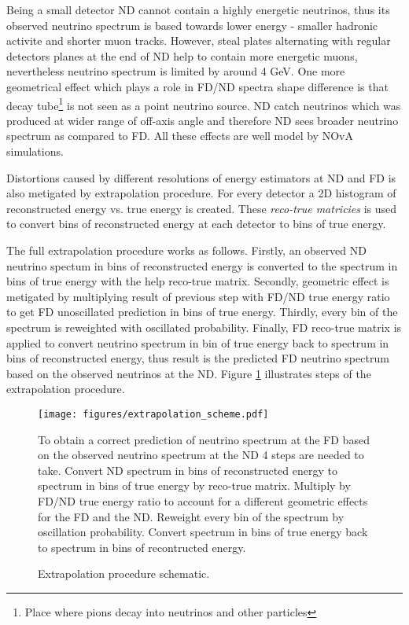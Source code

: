 Being a small detector ND cannot contain a highly energetic neutrinos, thus its observed neutrino
spectrum is based towards lower energy - smaller hadronic activite and shorter muon tracks. However,
steal plates alternating with regular detectors planes at the end of ND help to contain more
energetic muons, nevertheless neutrino spectrum is limited by around 4 GeV. One more geometrical effect
which plays a role in FD/ND spectra shape difference is that decay tube\footnote{Place where pions
decay into neutrinos and other particles} is not seen as a point neutrino source. ND catch neutrinos
which was produced at wider range of off-axis angle and therefore ND sees broader neutrino spectrum 
as compared to FD. All these effects are well model by NOvA simulations.

Distortions caused by different resolutions of energy estimators at ND and FD is also metigated by
extrapolation procedure. For every detector a 2D histogram of reconstructed energy vs. true energy
is created. These \textit{reco-true matricies} is used to convert bins of reconstructed energy at
each detector to bins of true energy. 

The full extrapolation procedure works as follows. Firstly, an observed ND neutrino spectum in bins of 
reconstructed energy is converted to the spectrum in bins of true energy with the help reco-true 
matrix. Secondly, geometric effect is metigated by multiplying result of previous step with FD/ND 
true energy ratio to get FD unoscillated prediction in bins of true energy. Thirdly, every bin of the 
spectrum is reweighted with oscillated probability. Finally, FD reco-true matrix is applied to 
convert neutrino spectrum in bin of true energy back to spectrum in bins of reconstructed energy,
thus result is the predicted FD neutrino spectrum based on the observed neutrinos at the ND. 
Figure \ref{fig:extrap_scheme} illustrates steps of the extrapolation procedure.
\begin{figure}[!th]
\centering
\texttt{[image: figures/extrapolation\_scheme.pdf]}
\caption{Extrapolation procedure schematic.}
{To obtain a correct prediction of neutrino spectrum at the FD based on the observed neutrino 
spectrum at the ND 4 steps are needed to take. Convert ND spectrum in bins of reconstructed energy to
spectrum in bins of true energy by reco-true matrix. Multiply by FD/ND true energy ratio to account
for a different geometric effects for the FD and the ND. Reweight every bin of the spectrum by
oscillation probability. Convert spectrum in bins of true energy back to spectrum in bins of
recontructed energy. }
\label{fig:extrap_scheme}
\end{figure}

